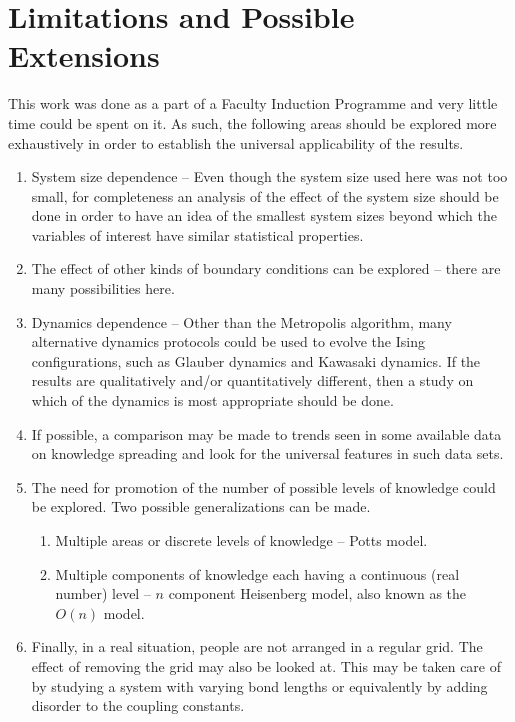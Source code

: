 \documentclass[a4paper,12pt]{article}
\begin{document}
\section{Limitations and Possible Extensions}
This work was done as a part of a Faculty Induction Programme and very
little time could be spent on it.
As such, the following areas
should be explored more exhaustively in order to establish the 
universal applicability of the results.
\begin{enumerate}
\item System size dependence --
  Even though the system size used here was not too small, for completeness an
  analysis of the effect of the system size should be done in
  order to have an idea of the smallest system
  sizes beyond which the variables of interest have similar statistical properties.
\item The effect of other kinds of boundary conditions can be explored -- there are
  many possibilities here.
\item Dynamics dependence -- Other than the Metropolis algorithm,
  many alternative dynamics protocols could be used to evolve the Ising
  configurations, such as Glauber dynamics\cite{glauber} and
  Kawasaki dynamics\cite{kawasaki}. If the results are qualitatively and/or
  quantitatively different, then a study on which of the dynamics is
  most appropriate should be done.
\item If possible, a comparison may be made to trends seen in some
  available data on knowledge spreading and look for the universal features
  in such data sets.
\item The need for promotion of the number of possible levels of knowledge could be explored.
  Two possible generalizations can be made.
  \begin{enumerate}
  \item Multiple areas or discrete levels of knowledge -- Potts model.\cite{potts}
  \item Multiple components of knowledge each having a continuous (real number) level
    -- $n$ component Heisenberg model, also known as the $O(n)$ model.\cite{on}
  \end{enumerate}
\item Finally, in a real situation, people are not arranged in a regular grid.
  The effect of removing the grid may also be looked at. This may be taken care of
  by studying a system with varying bond lengths or equivalently by adding disorder
  to the coupling constants.
\end{enumerate}
\end{document}

